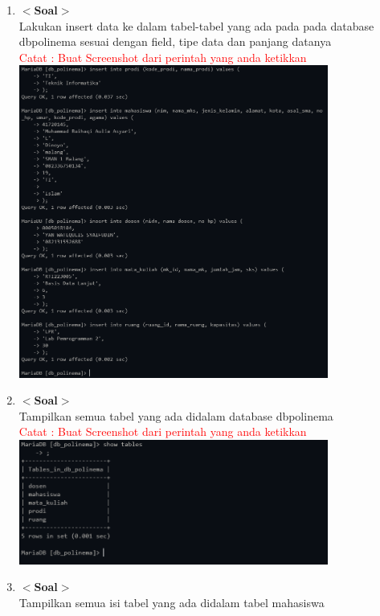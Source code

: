\documentclass[12pt,titlepage]{article}
\begin{document}
\begin{enumerate}
    \newpage
    \item \textbf{$<$Soal$>$} \\ Lakukan insert data ke dalam tabel-tabel yang ada pada pada database \newline db\textunderscore polinema sesuai dengan field, tipe data dan panjang datanya \\
    \textcolor{red}{Catat : Buat Screenshot dari perintah yang anda ketikkan} \\
    \includegraphics[width=0.8\textwidth]{images/figures/practicum-10.PNG}
    \item \textbf{$<$Soal$>$} \\ Tampilkan semua tabel yang ada didalam database db\textunderscore polinema \\
    \textcolor{red}{Catat : Buat Screenshot dari perintah yang anda ketikkan} \\
    \includegraphics[width=0.8\textwidth]{images/figures/practicum-11.PNG}\newpage
    \item \textbf{$<$Soal$>$} \\ Tampilkan semua isi tabel yang ada didalam tabel mahasiswa \\ 

\end{enumerate}
\end{document}
